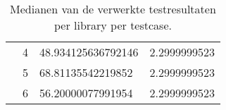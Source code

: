\begin{table}[]
\begin{tabular}{l|c|l|l}
                                                    & 4             & 48.934125636792146     & 2.2999999523           \\
                                                    & 5             & 68.81135542219852      & 2.2999999523           \\
                                                    & 6             & 56.20000077991954      & 2.2999999523          \\ \hline
\end{tabular}
\caption{Medianen van de verwerkte testresultaten per library per testcase.}
\label{medians}
\end{table}



